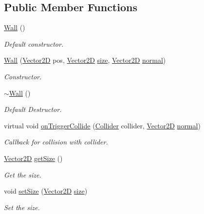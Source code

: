 \subsection*{Public Member Functions}
\begin{DoxyCompactItemize}
\item 
\mbox{\label{class_wall_a12dc41bc7bc045c55ec1034a43e52043}} 
\mbox{\hyperlink{class_wall_a12dc41bc7bc045c55ec1034a43e52043}{Wall}} ()
\begin{DoxyCompactList}\small\item\em Default constructor. \end{DoxyCompactList}\item 
\mbox{\hyperlink{class_wall_a870200286922c92e72ba9a3a676d410d}{Wall}} (\mbox{\hyperlink{struct_vector2_d}{Vector2D}} pos, \mbox{\hyperlink{struct_vector2_d}{Vector2D}} \mbox{\hyperlink{class_wall_a8dfde62c05835af7e342468a3270db97}{size}}, \mbox{\hyperlink{struct_vector2_d}{Vector2D}} \mbox{\hyperlink{class_collider_a9326e2676880c40f35832ed2c6d6b073}{normal}})
\begin{DoxyCompactList}\small\item\em Constructor. \end{DoxyCompactList}\item 
\mbox{\label{class_wall_a9a2992f2b533e1c160513d1e719f920c}} 
\mbox{\hyperlink{class_wall_a9a2992f2b533e1c160513d1e719f920c}{$\sim$\+Wall}} ()
\begin{DoxyCompactList}\small\item\em Default Destructor. \end{DoxyCompactList}\item 
virtual void \mbox{\hyperlink{class_wall_a04305c2b9f5030c2fb7270897a5f77a4}{on\+Trigger\+Collide}} (\mbox{\hyperlink{class_collider}{Collider}} collider, \mbox{\hyperlink{struct_vector2_d}{Vector2D}} \mbox{\hyperlink{class_collider_a9326e2676880c40f35832ed2c6d6b073}{normal}})
\begin{DoxyCompactList}\small\item\em Callback for collision with collider. \end{DoxyCompactList}\item 
\mbox{\label{class_wall_a4a2643e59555dbd0aebfcc752a7d1337}} 
\mbox{\hyperlink{struct_vector2_d}{Vector2D}} \mbox{\hyperlink{class_wall_a4a2643e59555dbd0aebfcc752a7d1337}{get\+Size}} ()
\begin{DoxyCompactList}\small\item\em Get the size. \end{DoxyCompactList}\item 
\mbox{\label{class_wall_a7661e969060ab84323eb2feb42bb907d}} 
void \mbox{\hyperlink{class_wall_a7661e969060ab84323eb2feb42bb907d}{set\+Size}} (\mbox{\hyperlink{struct_vector2_d}{Vector2D}} \mbox{\hyperlink{class_wall_a8dfde62c05835af7e342468a3270db97}{size}})
\begin{DoxyCompactList}\small\item\em Set the size. \end{DoxyCompactList}\end{DoxyCompactItemize}

